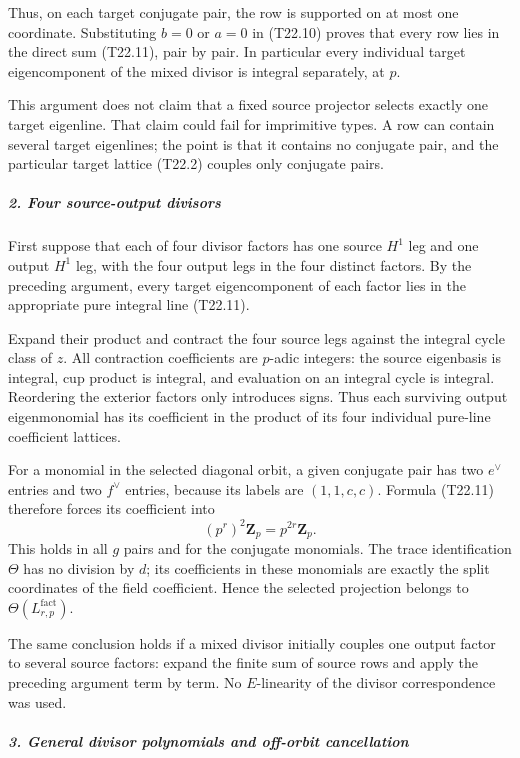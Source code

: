 Thus, on each target conjugate pair, the row is supported on at most one coordinate. Substituting \(b=0\) or \(a=0\) in (T22.10) proves that every row lies in the direct sum (T22.11), pair by pair. In particular every individual target eigencomponent of the mixed divisor is integral separately, at \(p\).

This argument does not claim that a fixed source projector selects exactly one target eigenline. That claim could fail for imprimitive types. A row can contain several target eigenlines; the point is that it contains no conjugate pair, and the particular target lattice (T22.2) couples only conjugate pairs.

\subparagraph{2. Four source-output divisors}\label{four-source-output-divisors}

First suppose that each of four divisor factors has one source \(H^1\) leg and one output \(H^1\) leg, with the four output legs in the four distinct factors. By the preceding argument, every target eigencomponent of each factor lies in the appropriate pure integral line (T22.11).

Expand their product and contract the four source legs against the integral cycle class of \(z\). All contraction coefficients are \(p\)-adic integers: the source eigenbasis is integral, cup product is integral, and evaluation on an integral cycle is integral. Reordering the exterior factors only introduces signs. Thus each surviving output eigenmonomial has its coefficient in the product of its four individual pure-line coefficient lattices.

For a monomial in the selected diagonal orbit, a given conjugate pair has two \(e^\vee\) entries and two \(f^\vee\) entries, because its labels are \((1,1,c,c)\). Formula (T22.11) therefore forces its coefficient into \[
 (p^r)^2\mathbf Z_p=p^{2r}\mathbf Z_p.
\] This holds in all \(g\) pairs and for the conjugate monomials. The trace identification \(\Theta\) has no division by \(d\); its coefficients in these monomials are exactly the split coordinates of the field coefficient. Hence the selected projection belongs to \(\Theta(L^{\mathrm{fact}}_{r,p})\).

The same conclusion holds if a mixed divisor initially couples one output factor to several source factors: expand the finite sum of source rows and apply the preceding argument term by term. No \(E\)-linearity of the divisor correspondence was used.

\subparagraph{3. General divisor polynomials and off-orbit cancellation}\label{general-divisor-polynomials-and-off-orbit-cancellation}

